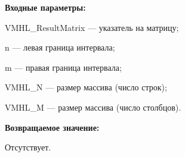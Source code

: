 \textbf{Входные параметры:}
 
VMHL\_ResultMatrix --- указатель на матрицу;
 
n --- левая граница интервала;
 
m --- правая граница интервала;
 
VMHL\_N --- размер массива (число строк);
 
VMHL\_M --- размер массива (число столбцов).

\textbf{Возвращаемое значение:}

Отсутствует.